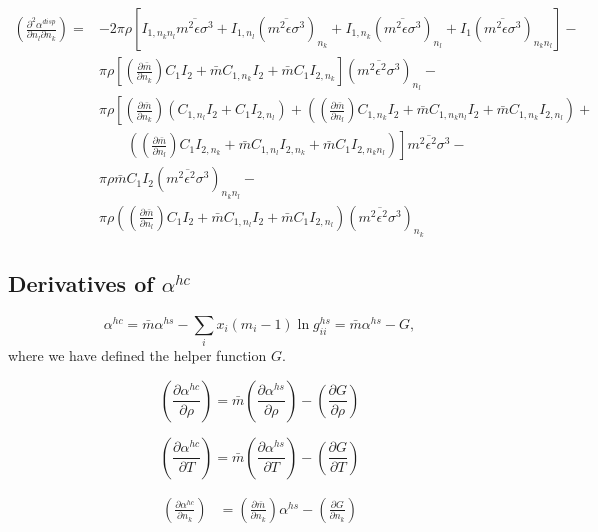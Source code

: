 \documentclass[english]{../thermomemo/thermomemo}
\newcommand*{\pder}[2]{\left(\frac{\partial #1}{\partial #2}\right)}
\newcommand*{\pdcross}[3]{\left(\frac{\partial^2 #1}{\partial #2 \partial #3}\right)}
\begin{document}
\begin{equation}
  \begin{aligned} %
    \pdcross{\alpha^{disp}}{n_l}{n_k} =& -2 \pi \rho \left[ I_{1,n_k n_l} \overline{m^2 \epsilon \sigma^3} + I_{1,n_l} (\overline{m^2 \epsilon \sigma^3})_{n_k} + I_{1,n_k} (\overline{m^2 \epsilon \sigma^3})_{n_l} + I_1 (\overline{m^2 \epsilon \sigma^3})_{n_k n_l} \right] -\\
    & \pi \rho \left[ \pder{\bar m}{n_k} C_1 I_2 + \bar m C_{1,n_k} I_2 + \bar m C_1 I_{2,n_k} \right] (\overline{m^2 \epsilon^2 \sigma^3})_{n_l} -\\
    & \pi \rho \left[ \pder{\bar m}{n_k} (C_{1,n_l} I_2 + C_1 I_{2,n_l}) + (\pder{\bar m}{n_l} C_{1,n_k} I_2 + \bar m C_{1,n_k n_l} I_2 + \bar m C_{1,n_k} I_{2,n_l}) + \right. \\
    & \qquad \left. (\pder{\bar m}{n_l} C_1 I_{2,n_k} + \bar m C_{1,n_l} I_{2,n_k} + \bar m C_1 I_{2,n_k n_l}) \right] \overline{m^2 \epsilon^2 \sigma^3} -\\
    & \pi \rho \bar m C_1 I_2 (\overline{m^2 \epsilon^2 \sigma^3})_{n_k n_l} - \\
    & \pi \rho (\pder{\bar m}{n_l} C_1 I_2 + \bar m C_{1,n_l} I_2 + \bar m C_1 I_{2,n_l}) (\overline{m^2 \epsilon^2 \sigma^3})_{n_k}
  \end{aligned}
\end{equation}

\subsection{Derivatives of $\alpha^{hc}$}
\begin{equation}
  \alpha^{hc} = \bar m \alpha^{hs} - \sum_i x_i(m_i-1)\ln g_{ii}^{hs} = \bar m \alpha^{hs} - G,
\end{equation}
where we have defined the helper function $G$.

\begin{equation}
  \pder{\alpha^{hc}}{\rho} = \bar m \pder{\alpha^{hs}}{\rho} - \pder{G}{\rho}
\end{equation}

\begin{equation}
  \pder{\alpha^{hc}}{T} = \bar m \pder{\alpha^{hs}}{T} - \pder{G}{T}
\end{equation}

\begin{equation}
  \begin{aligned}
      \pder{\alpha^{hc}}{n_k} &= \pder{\bar m}{n_k} \alpha^{hs} - \pder{G}{n_k}
    \end{aligned}
\end{equation}
\end{document}
